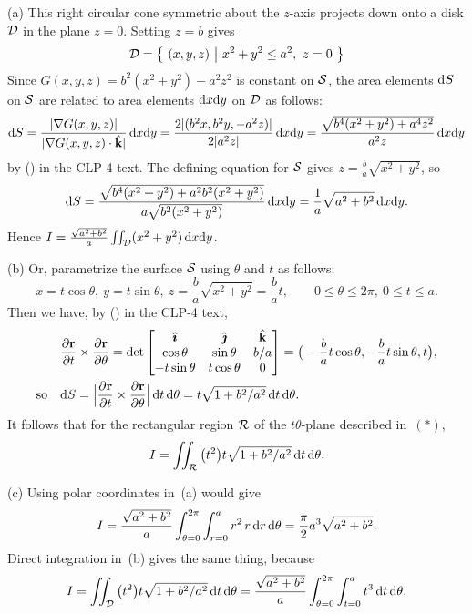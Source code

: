 \begin{solution} 
(a)
This right circular cone symmetric about the $z$-axis projects down
onto a disk $\mathcal{D}$ in the plane $z=0$.  Setting $z=b$ gives
$$
\mathcal{D}=\big\{ \ (x,y,z)\ \big|\ x^2 + y^2 \le a^2,\  z=0\ \big\}
$$
Since $G(x,y,z) = b^2(x^2+y^2)-a^2z^2$ is constant on $\mathcal{S}$, the
area elements $\mathrm{d}S$ on $\mathcal{S}$ are related to area elements 
$\mathrm{d}x\mathrm{d}y$ on $\mathcal{D}$ as follows:
$$
\mathrm{d}S = \frac{|\nabla G(x,y,z)|}{ |\nabla G(x,y,z)\cdot\hat{\mathbf{k}}|}\,\mathrm{d}x\mathrm{d}y
= \frac{2|(b^2 x,b^2 y,-a^2 z)|}{2|a^2z|}\,\mathrm{d}x\mathrm{d}y
= \frac{\sqrt{b^4(x^2+y^2)+a^4 z^2}}{ a^2 z}\,\mathrm{d}x\mathrm{d}y
$$
by () in the CLP-4 text.
The defining equation for $\mathcal{S}$ gives $z=\frac{b}{ a}\sqrt{x^2+y^2}$,
so
$$
\mathrm{d}S
= \frac{\sqrt{b^4(x^2+y^2)+a^2 b^2(x^2+y^2)}}{ a\sqrt{b^2(x^2+y^2)}}\,\mathrm{d}x\mathrm{d}y
= \frac{1}{ a}\sqrt{a^2+b^2}\,\mathrm{d}x\mathrm{d}y.
$$
Hence $I = \frac{\sqrt{a^2+b^2}}{ a}\iint_{\mathcal{D}}(x^2+y^2)\,\mathrm{d}x\mathrm{d}y$.

(b)
Or, parametrize the surface $\mathcal{S}$ using $\theta$ and $t$ as
follows:
\begin{equation}
x = t\cos\theta,\
y=t\sin\theta,\ 
z = \frac{b}{ a}\sqrt{x^2+y^2} = \frac{b}{ a}t,
\qquad
0\le\theta\le 2\pi,\ 0\le t\le a.
\tag{$*$}
\end{equation}
Then we have, by () in the CLP-4 text,
\begin{align*}
&\frac{\partial\mathbf{r}}{\partial t}\times\frac{\partial\mathbf{r}}{\partial\theta}
= \det\left[\begin{matrix} \hat{\pmb{\imath}} & \hat{\pmb{\jmath}} & \hat{\mathbf{k}} \\
\cos\theta & \sin\theta & b/a \\
-t\sin\theta & t\cos\theta & 0 \end{matrix}\right]
= \big(-\frac{b}{ a}t\cos\theta, -\frac{b}{ a}t\sin\theta, t\big),
\\
{\rm so}\quad
&\mathrm{d}S = \Big|\frac{\partial\mathbf{r}}{\partial t}\times
            \frac{\partial\mathbf{r}}{\partial\theta}\Big|\,\mathrm{d}t\,\mathrm{d}\theta
= t\sqrt{1+b^2/a^2}\,\mathrm{d}t\,\mathrm{d}\theta.
\end{align*}
It follows that for the rectangular region $\mathcal{R}$ of the
$t\theta$-plane described in~$(*)$,
$$
I = \iint_{\mathcal{R}} \big(t^2\big)t\sqrt{1+b^2/a^2}\,\mathrm{d}t\,\mathrm{d}\theta.
$$

(c)
Using polar coordinates in~(a) would give
$$
I
= \frac{\sqrt{a^2+b^2}}{ a}
  \int_{\theta=0}^{2\pi} \int_{r=0}^a r^2\,r\,\mathrm{d}r\,\mathrm{d}\theta
=\frac{\pi}{ 2}a^3\sqrt{a^2+b^2}.
$$
Direct integration in~(b) gives the same thing, because
$$
I
= \iint_{\mathcal{D}} \big(t^2\big)t\sqrt{1+b^2/a^2}\,\mathrm{d}t\,\mathrm{d}\theta
= \frac{\sqrt{a^2+b^2}}{ a}\int_{\theta=0}^{2\pi} \int_{t=0}^a
t^3\,\mathrm{d}t\,\mathrm{d}\theta.
$$
\end{solution}


